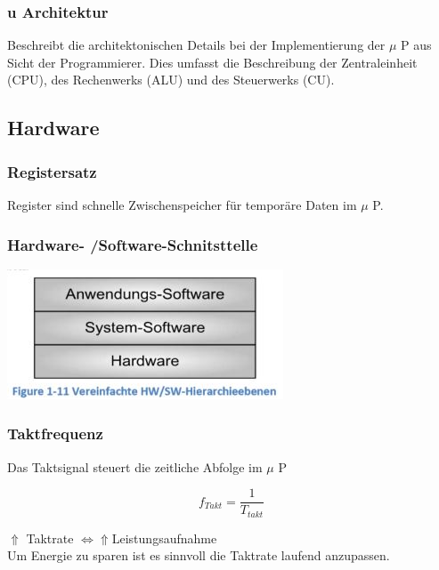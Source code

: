 \subsubsection{u Architektur}
Beschreibt die architektonischen Details bei der Implementierung der $\mu$ P aus Sicht der Programmierer.
Dies umfasst die Beschreibung der Zentraleinheit (CPU), des Rechenwerks (ALU) und des Steuerwerks (CU).


\clearpage
\begin{minipage}{10cm}
\subsection{Hardware}
\subsubsection{Registersatz}
Register sind schnelle Zwischenspeicher für \newline
temporäre Daten im $\mu$ P.
\end{minipage}
\begin{minipage}{0.5\linewidth}
\subsubsection{Hardware- /Software-Schnitsttelle}
\includegraphics{images/HardwareSoftware}
\end{minipage}

\subsubsection{Taktfrequenz}
Das Taktsignal steuert die zeitliche Abfolge im $\mu$ P \newline
\begin{multicols}{2}
        \begin{minipage}{\linewidth}
    \[ f_{Takt}= \frac{1}{T_{takt}} \]
        \end{minipage}
    
    \begin{minipage}{\linewidth}
        $ \Uparrow $ Taktrate $ \Leftrightarrow $$  \Uparrow  $Leistungsaufnahme \\
        Um Energie zu sparen ist es sinnvoll die Taktrate laufend anzupassen.\\
    \end{minipage}
\end{multicols}

